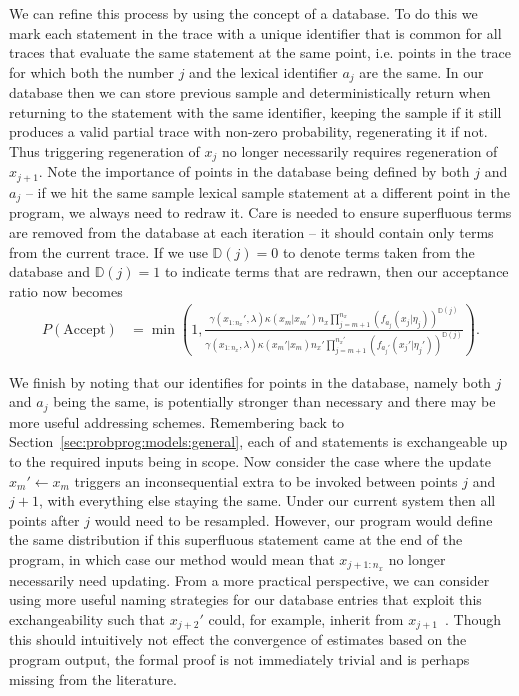 We can refine this process by using the concept of a database.  To do this we mark each \sample
statement in the trace with a unique identifier that is common for all traces that evaluate the same \sample
statement at the same point, i.e. points in the trace for which both the \sample number $j$ and 
the lexical \sample identifier $a_j$ are the same.  In our database then we can store previous
sample and deterministically return when returning to the \sample statement with the same identifier, keeping
the sample if it still produces a valid partial trace with non-zero probability,
regenerating it if not.  Thus triggering regeneration of $x_j$ no longer necessarily requires regeneration of $x_{j+1}$.
Note the importance of points in the database being defined by both $j$ and $a_j$ -- if we hit the same sample
lexical sample statement at a different point in the program, we always need to redraw it.
Care is needed to ensure superfluous terms are removed from the database at each iteration -- it should
contain only terms from the current trace.  If we use $\mathbb{D}(j)=0$ to denote terms taken from
the database and $\mathbb{D}(j)=1$ to indicate terms that are redrawn, then our acceptance ratio now becomes
\begin{align}
P(\text{Accept}) &= \min\left(1, \frac{\gamma(x_{1:n_x}',\lambda) \kappa(x_m | x_{m}') n_x \prod_{j=m+1}^{n_x} 
	\left(f_{a_{j}} (x_j | \eta_j)\right)^{\mathbb{D}(j)}}
{\gamma(x_{1:n_x},\lambda) \kappa(x_m' | x_{m})  n_x' \prod_{j=m+1}^{n_x'} \left(f_{a_{j}'} (x_j' | \eta_j')\right)^{\mathbb{D}(j)}}\right).
\end{align}

We finish by noting that our identifies for points in the database, namely both $j$ and $a_j$ being the same, is
potentially stronger than necessary and there may be more useful addressing schemes.  Remembering back
to Section~\ref{sec:probprog:models:general}, each of \sample and \observe statements is exchangeable up to
the required inputs being in scope.  Now consider the case where the update $x_m'\leftarrow x_m$ triggers an
inconsequential extra \sample to be invoked between points $j$ and $j+1$, with everything else staying the same.
Under our current system then all points after $j$ would need to be resampled.  However, our program would
define the same distribution if this superfluous \sample statement came at the end of the program, in which case
our method would mean that $x_{j+1:n_x}$ no longer necessarily need updating.  From a more practical perspective,
we can consider using more useful naming strategies for our database entries that exploit this exchangeability such
that $x_{j+2}'$ could, for example, inherit from $x_{j+1}$~\citep{wingate2011lightweight}.  Though this should
intuitively not effect the convergence of estimates based on the program output, the formal proof is not immediately
trivial and is perhaps missing from the literature.

